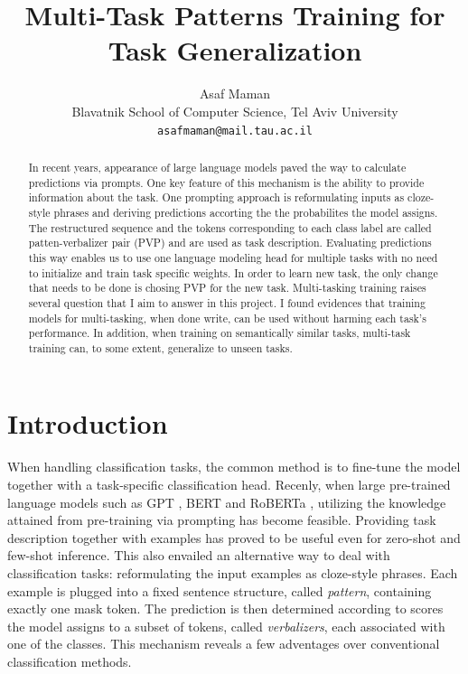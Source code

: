 \documentclass[11pt,a4paper]{article}
\title{Multi-Task Patterns Training for Task Generalization}
\author{Asaf Maman \\
  Blavatnik School of Computer Science, Tel Aviv University \\
  \texttt{asafmaman@mail.tau.ac.il} \\}
\date{}
\begin{document}
\maketitle

\begin{abstract}
In recent years, appearance of large language models paved the way to calculate predictions via prompts.
One key feature of this mechanism is the ability to provide information about the task.
One prompting approach is reformulating inputs as cloze-style phrases and deriving predictions accorting the the probabilites the model assigns.
The restructured sequence and the tokens corresponding to each class label are called patten-verbalizer pair (PVP) and are used as task description.
Evaluating predictions this way enables us to use one language modeling head for multiple tasks with no need to initialize and train task specific weights.
In order to learn new task, the only change that needs to be done is chosing PVP for the new task. 
Multi-tasking training raises several question that I aim to answer in this project.
I found evidences that training models for multi-tasking, when done write, can be used without harming each task's performance.
In addition, when training on semantically similar tasks, multi-task training can, to some extent, generalize to unseen tasks.
\end{abstract}


\section{Introduction}

When handling classification tasks, the common method is to fine-tune the model together with a task-specific classification head.
Recenly, when large pre-trained language models such as GPT \citep{radford2018improving}, BERT \citep{devlin2019bert} and RoBERTa \citep{liu2019roberta}, utilizing the knowledge attained from pre-training via prompting has become feasible.
Providing task description together with examples has proved to be useful \citep{radford2019language} even for zero-shot and few-shot inference.
This also envailed an alternative way to deal with classification tasks: reformulating the input examples as cloze-style phrases.
Each example is plugged into a fixed sentence structure, called \textit{pattern}, containing exactly one mask token.
The prediction is then determined according to scores the model assigns to a subset of tokens, called \textit{verbalizers}, each associated with one of the classes.
This mechanism reveals a few adventages over conventional classification methods.
\end{document}
